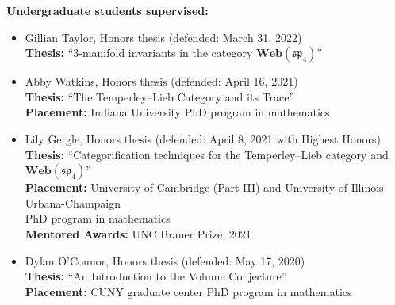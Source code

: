 \documentclass[10pt]{article}
\begin{document}
\smallskip
\noindent\textbf{Undergraduate students supervised:}
\begin{itemize}

\item Gillian Taylor, Honors thesis (defended: March 31, 2022) \\
\noindent\textbf{Thesis:} ``$3$-manifold invariants in the category $\mathbf{Web}(\mathfrak{sp}_4)$''


\item Abby Watkins, Honors thesis (defended: April 16, 2021) \\
\noindent\textbf{Thesis:} ``The Temperley--Lieb Category and its Trace'' \\
\noindent \textbf{Placement:} Indiana University PhD program in mathematics

\item Lily Gergle, Honors thesis (defended: April 8, 2021 with Highest Honors) \\
\noindent\textbf{Thesis:} ``Categorification techniques for the Temperley--Lieb category and $\mathbf{Web}(\mathfrak{sp}_4)$'' \\
\noindent \textbf{Placement:} University of Cambridge (Part III) and University of Illinois Urbana-Champaign \\ 
PhD program in mathematics \\
\textbf{Mentored Awards:} UNC Brauer Prize, 2021

\item Dylan O'Connor, Honors thesis (defended: May 17, 2020) \\
\noindent\textbf{Thesis:} ``An Introduction to the Volume Conjecture'' \\
\noindent \textbf{Placement:} CUNY graduate center PhD program in mathematics

\end{itemize}
\end{document}
